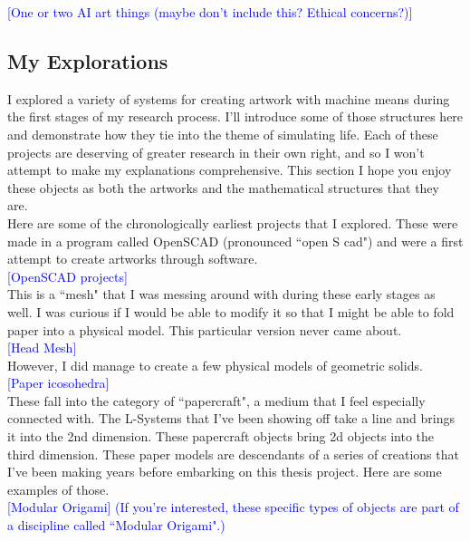 \documentclass[12pt,twoside]{reedthesis}
\begin{document}
	\textcolor{blue}{[One or two AI art things (maybe don't include this? Ethical concerns?)]}
	
\subsection{My Explorations} %
	
	I explored a variety of systems for creating artwork with machine means during the first stages of my research process. I'll introduce some of those structures here and demonstrate how they tie into the theme of simulating life. Each of these projects are deserving of greater research in their own right, and so I won't attempt to make my explanations comprehensive. This section I hope you enjoy these objects as both the artworks and the mathematical structures that they are.\\

	Here are some of the chronologically earliest projects that I explored. These were made in a program called OpenSCAD (pronounced ``open S cad") and were a first attempt to create artworks through software.\\
	
	\textcolor{blue}{[OpenSCAD projects]}\\
	
	This is a ``mesh" that I was messing around with during these early stages as well. I was curious if I would be able to modify it so that I might be able to fold paper into a physical model. This particular version never came about.\\
	
	\textcolor{blue}{[Head Mesh]}\\
	
	However, I did manage to create a few physical models of geometric solids.\\
	
	\textcolor{blue}{[Paper icosohedra]}\\
	
	These fall into the category of ``papercraft", a medium that I feel especially connected with. The L-Systems that I've been showing off take a line and brings it into the 2nd dimension. These papercraft objects bring 2d objects into the third dimension. These paper models are descendants of a series of creations that I've been making years before embarking on this thesis project. Here are some examples of those.\\
	
	\textcolor{blue}{[Modular Origami] (If you're interested, these specific types of objects are part of a discipline called ``Modular Origami".)}\\
	
\end{document}
